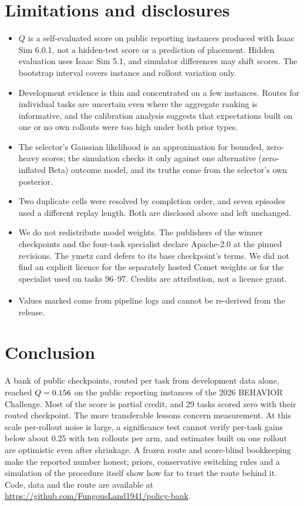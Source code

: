 \documentclass[10pt]{article}
\newcommand{\Q}{\ensuremath{Q}}
\newcommand{\pl}{\textsuperscript{\dag}}
\begin{document}
\section{Limitations and disclosures}
\begin{itemize}
\item \Q{} is a self-evaluated score on public reporting instances produced with Isaac Sim 6.0.1, not a hidden-test score or a prediction of placement. Hidden evaluation uses Isaac Sim 5.1, and simulator differences may shift scores. The bootstrap interval covers instance and rollout variation only.
\item Development evidence is thin and concentrated on a few instances. Routes for individual tasks are uncertain even where the aggregate ranking is informative, and the calibration analysis suggests that expectations built on one or no own rollouts were too high under both prior types.
\item The selector's Gaussian likelihood is an approximation for bounded, zero-heavy scores; the simulation checks it only against one alternative (zero-inflated Beta) outcome model, and its truths come from the selector's own posterior.
\item Two duplicate cells were resolved by completion order, and seven episodes used a different replay length. Both are disclosed above and left unchanged.
\item We do not redistribute model weights. The publishers of the winner checkpoints and the four-task specialist declare Apache-2.0 at the pinned revisions. The ymetz card defers to its base checkpoint's terms. We did not find an explicit licence for the separately hosted Comet weights or for the specialist used on tasks 96--97. Credits are attribution, not a licence grant.
\item Values marked \pl{} come from pipeline logs and cannot be re-derived from the release.
\end{itemize}

\section{Conclusion}
A bank of public checkpoints, routed per task from development data alone, reached $\Q=\Qval$ on the public reporting instances of the 2026 BEHAVIOR Challenge. Most of the score is partial credit, and 29 tasks scored zero with their routed checkpoint. The more transferable lessons concern measurement. At this scale per-rollout noise is large, a significance test cannot verify per-task gains below about 0.25 with ten rollouts per arm, and estimates built on one rollout are optimistic even after shrinkage. A frozen route and score-blind bookkeeping make the reported number honest; priors, conservative switching rules and a simulation of the procedure itself show how far to trust the route behind it. Code, data and the route are available at \url{https://github.com/FungousLand1941/policy-bank}.
\end{document}
